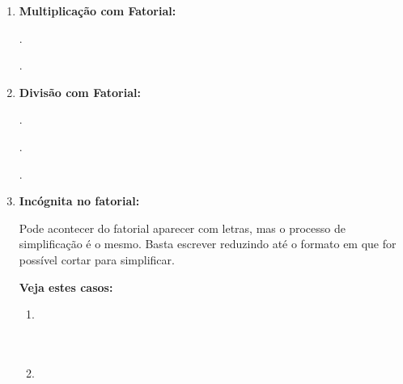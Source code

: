 \begin{multicols*}{2}
\begin{enumerate}

		\item \textbf{Multiplicação com Fatorial:}

		      .

		      .

		\item \textbf{Divisão com Fatorial:}

		      .

		      .

		      .

		\item \textbf{Incógnita no fatorial:}

		      Pode acontecer do fatorial aparecer com letras, mas o processo de simplificação é o mesmo. Basta escrever reduzindo até o formato em que for possível cortar para simplificar.

		      \textbf{Veja estes casos:}

		      \begin{enumerate}

			      \item 	{}\\

			            \\

			            \\

			      \item 	{}\\

			            \\

			            \\

			            \\


\end{enumerate}
\end{enumerate}
\end{multicols*}

